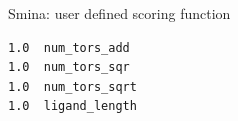 \begin{frame}[fragile]
\begin{columns}
    \begin{column}{0.55\textwidth}
\begin{block}{Smina: user defined scoring function}
\begin{lstlisting}[language={},caption = smina user defined parameters example, frame=single]
1.0  num_tors_add
1.0  num_tors_sqr
1.0  num_tors_sqrt
1.0  ligand_length
\end{lstlisting}
\end{block}
    \end{column}   
    \end{columns}
\end{frame}

